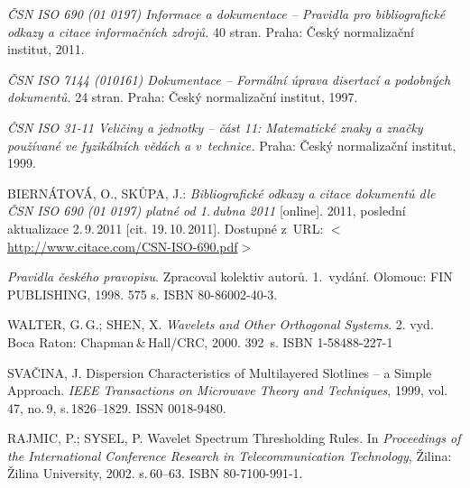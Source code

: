 \begin{thebibliography}{99}
    \emph{ČSN ISO 690 (01 0197) Informace a dokumentace -- Pravidla pro bibliografické odkazy a citace informačních zdrojů.}
    40 stran. Praha: Český normalizační institut, 2011.

    \emph{ČSN ISO 7144 (010161) Dokumentace -- Formální úprava disertací a podobných dokumentů.}
    24 stran. Praha: Český normalizační institut, 1997.

    \emph{ČSN ISO 31-11 Veličiny a jednotky -- část 11: Matematické znaky a značky používané ve fyzikálních vědách a v~technice.}
    Praha: Český normalizační institut, 1999.

    BIERNÁTOVÁ, O., SKŮPA, J.:
    \emph{Bibliografické odkazy a citace dokumentů dle ČSN ISO 690 (01 0197) platné od 1.\,dubna 2011}\/ [online].
    2011, poslední aktualizace 2.\,9.\,2011 [cit. 19.\,10.\,2011].
    Dostupné z~URL:
    \(<\)\url{http://www.citace.com/CSN-ISO-690.pdf}\(>\)

    \emph{Pravidla českého pravopisu}.
    Zpracoval kolektiv autorů. 1.\ vydání.
    Olomouc: FIN PUB\-LISH\-ING, 1998. 575 s. ISBN 80-86002-40-3.

	WALTER, G.\,G.; SHEN, X.
	\emph{Wavelets and Other Orthogonal Systems}.
	2. vyd. Boca Raton: Chapman\,\&\,Hall/CRC, 2000. 392~s. ISBN 1-58488-227-1

	SVAČINA, J.
	Dispersion Characteristics of Multilayered Slotlines -- a Simple Approach.
	\emph{IEEE Transactions on Microwave Theory and Techniques},
	1999, vol.\,47, no.\,9, s.\,1826--1829. ISSN 0018-9480.

    RAJMIC, P.; SYSEL, P.
    Wavelet Spectrum Thresholding Rules.
    In \emph{Proceedings of the International Conference Research in Telecommunication Technology},
    Žilina: Žilina University, 2002. s.\,60--63. ISBN 80-7100-991-1.

\end{thebibliography}


%
%
%
